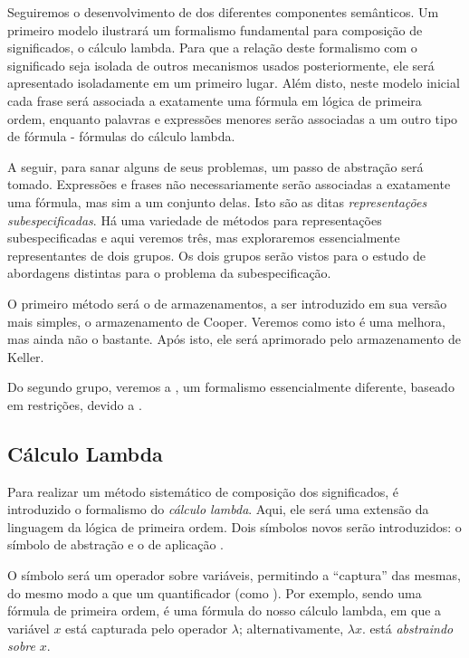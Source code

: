 	Seguiremos o desenvolvimento de \citet{BlackburnBos:2005} dos diferentes componentes semânticos. Um primeiro modelo ilustrará um formalismo fundamental para composição de significados, o cálculo lambda. Para que a relação deste formalismo com o significado seja isolada de outros mecanismos usados posteriormente, ele será apresentado isoladamente em um primeiro lugar. Além disto, neste modelo inicial cada frase será associada a exatamente uma fórmula em lógica de primeira ordem, enquanto palavras e expressões menores serão associadas a um outro tipo de fórmula - fórmulas do cálculo lambda.
	
	A seguir, para sanar alguns de seus problemas, um passo de abstração será tomado. Expressões e frases não necessariamente serão associadas a exatamente uma fórmula, mas sim a um conjunto delas. Isto são as ditas \textit{representações subespecificadas}. Há uma variedade de métodos para representações subespecificadas e aqui veremos três, mas exploraremos essencialmente representantes de dois grupos. Os dois grupos serão vistos para o estudo de abordagens distintas para o problema da subespecificação. \citep[p.~150--153]{BlackburnBos:2005}
	
	O primeiro método será o de armazenamentos, a ser introduzido em sua versão mais simples, o armazenamento de Cooper. Veremos como isto é uma melhora, mas ainda não o bastante. Após isto, ele será aprimorado pelo armazenamento de Keller.
	
	Do segundo grupo, veremos a , um formalismo essencialmente diferente, baseado em restrições, devido a \citet{HoleSem}.

\subsection{Cálculo Lambda}

Para realizar um método sistemático de composição dos significados, é introduzido o formalismo do \textit{cálculo lambda}. Aqui, ele será uma extensão da linguagem da lógica de primeira ordem. Dois símbolos novos serão introduzidos: o símbolo de abstração \expr{$\lambda$} e o de aplicação .

O símbolo \expr{$\lambda$} será um operador sobre variáveis, permitindo a ``captura'' das mesmas, do mesmo modo a que um quantificador (como \expr{$\forall$}). Por exemplo, sendo  uma fórmula de primeira ordem,  é uma fórmula do nosso cálculo lambda, em que a variável $x$ está capturada pelo operador $\lambda$; alternativamente, $\lambda x.$ está \textsl{abstraindo sobre} $x$. 

